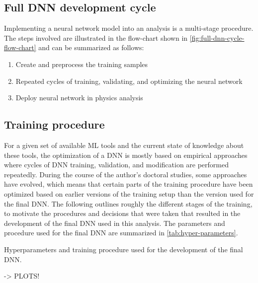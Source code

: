 \subsection{Full DNN development cycle}
Implementing a neural network model into an analysis is a multi-stage procedure. 
The steps involved are illustrated in the flow-chart shown in \cref{fig:full-dnn-cycle-flow-chart} and can be summarized as follows:

\begin{enumerate}
    \item Create and preprocess the training samples
    \item Repeated cycles of training, validating, and optimizing the neural network
    \item Deploy neural network in physics analysis
\end{enumerate}


\subsection{Training procedure}
For a given set of available ML tools and the current state of knowledge about these tools, the optimization of a DNN is mostly based on empirical approaches where cycles of DNN training, validation, and modification are performed repeatedly. 
During the course of the author's doctoral studies, some approaches have evolved, which means that certain parts of the training procedure have been optimized based on earlier versions of the training setup than the version used for the final DNN. 
The following outlines roughly the different stages of the training, to motivate the procedures and decisions that were taken that resulted in the development of the final DNN used in this analysis. 
The parameters and procedure used for the final DNN are summarized in \cref{tab:hyper-parameters}.


\begin{table}[ht]
    \begin{center}
    
    \end{center}
    \caption{Hyperparameters and training procedure used for the development of the final DNN.
    }
    \label{tab:DNN-info}
\end{table}



-> PLOTS!


